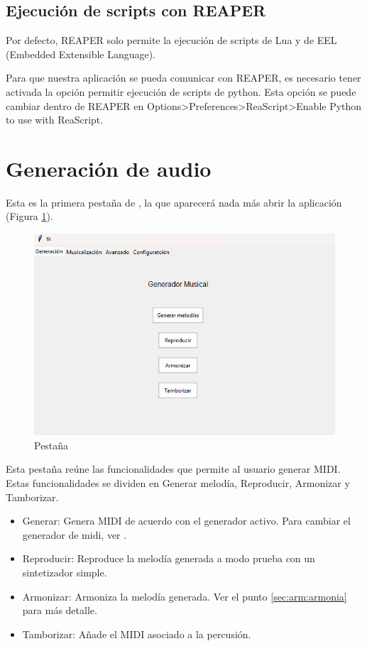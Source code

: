 \subsection{Ejecución de scripts con REAPER}
Por defecto, REAPER solo permite la ejecución de scripts de Lua y de EEL (Embedded Extensible Language).

Para que nuestra aplicación se pueda comunicar con REAPER, es necesario tener activada la opción permitir ejecución de scripts de python. Esta opción se puede cambiar dentro de REAPER en Options>Preferences>ReaScript>Enable Python to use with ReaScript.

\section{Generación de audio}
\label{sec:app:generacionAudio}
	Esta es la primera pestaña de \appName{}, la que aparecerá nada más abrir la aplicación (Figura \ref{fig:generationTab}).

\begin{figure}[h]
    \begin{center}
        \includegraphics[scale=0.75]{Imagenes/Bitmap/generationTab.png}
    \end{center}
    \caption{Pestaña \generationTabName{}}
    \label{fig:generationTab}
\end{figure}

Esta pestaña reúne las funcionalidades que permite al usuario generar MIDI. Estas funcionalidades se dividen en Generar melodía, Reproducir, Armonizar y Tamborizar.

\begin{itemize}
  \item Generar: Genera MIDI de acuerdo con el generador activo. Para cambiar el generador de midi, ver .
  \item Reproducir: Reproduce la melodía generada a modo prueba con un sintetizador simple.
  \item Armonizar: Armoniza la melodía generada. Ver el punto \ref{sec:arm:armonia} para más detalle.
  \item Tamborizar: Añade el MIDI asociado a la percusión.
\end{itemize}

